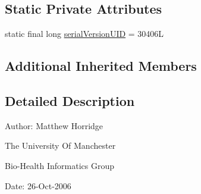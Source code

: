 \subsection*{Static Private Attributes}
\begin{DoxyCompactItemize}
\item 
static final long \hyperlink{classuk_1_1ac_1_1manchester_1_1cs_1_1owl_1_1owlapi_1_1_o_w_l_property_expression_impl_3_01_r_01e672e5abee4203a562fc61711ec3f6ded_ae966d04fe498477f3f7024cc7b528cd3}{serial\-Version\-U\-I\-D} = 30406\-L
\end{DoxyCompactItemize}
\subsection*{Additional Inherited Members}


\subsection{Detailed Description}
Author\-: Matthew Horridge\par
 The University Of Manchester\par
 Bio-\/\-Health Informatics Group\par
 Date\-: 26-\/\-Oct-\/2006\par
\par
 


